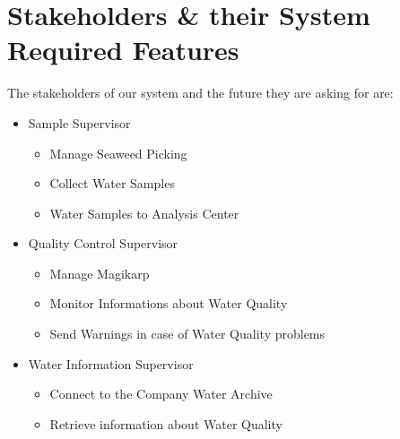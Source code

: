 \newpage \chapter{\textbf{Stakeholders \& their System Required Features}}

The stakeholders of our system and the future they are asking for are:

\begin{itemize}

\item{Sample Supervisor}

\begin{itemize}
\item{Manage Seaweed Picking}
\item{Collect Water Samples}
\item{Water Samples to Analysis Center}
\end{itemize}

\item{Quality Control Supervisor}

\begin{itemize}
\item{Manage Magikarp}
\item{Monitor Informations about Water Quality}
\item{Send Warnings in case of Water Quality problems}
\end{itemize}

\item{Water Information Supervisor}

\begin{itemize}
\item{Connect to the Company Water Archive}
\item{Retrieve information about Water Quality}
\end{itemize}

\end{itemize}